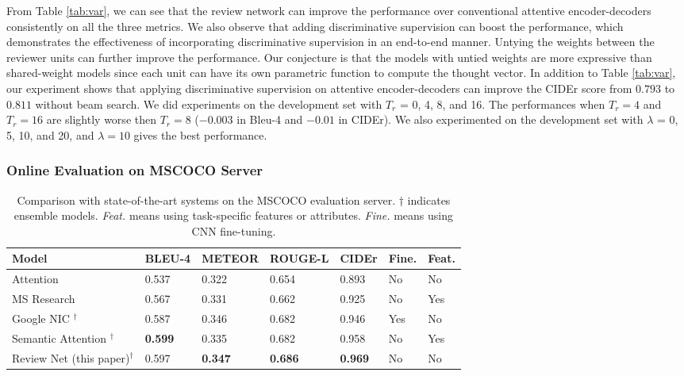 \documentclass{article}
\begin{document}
From Table \ref{tab:var}, we can see that the review network can improve the performance over conventional attentive encoder-decoders consistently on all the three metrics.
We also observe that adding discriminative supervision can boost the performance, which demonstrates the effectiveness of incorporating discriminative supervision in an end-to-end manner.
Untying the weights between the reviewer units can further improve the performance. Our conjecture is that the models with untied weights are more expressive than shared-weight models since each unit can have its own parametric function to compute the thought vector. In addition to Table \ref{tab:var}, our experiment shows that applying discriminative supervision on attentive encoder-decoders can improve the CIDEr score from $0.793$ to $0.811$ without beam search. We did experiments on the development set with $T_r$ = 0, 4, 8, and 16. The performances when $T_r = 4$ and $T_r = 16$ are slightly worse then $T_r = 8$ ($-0.003$ in Bleu-4 and $-0.01$ in CIDEr). We also experimented on the development set with $\lambda$ = 0, 5, 10, and 20, and $\lambda = 10$ gives the best performance.

\subsubsection{Online Evaluation on MSCOCO Server}\begin{table}[t]
  \caption{\small Comparison with state-of-the-art systems on the MSCOCO evaluation server. $\dagger$ indicates ensemble models. \textit{Feat.} means using task-specific features or attributes. \textit{Fine.} means using CNN fine-tuning.}
  \label{tab:sota}
  \centering
  \begin{tabular}{lllllll}
    \toprule
    Model & BLEU-4 & METEOR & ROUGE-L & CIDEr & Fine. & Feat. \\
    \midrule
    Attention \cite{xu2015show} & 0.537 & 0.322 & 0.654 & 0.893 & No & No \\
    MS Research \cite{fang2015captions} & 0.567  & 0.331 & 0.662 & 0.925 & No & Yes \\
    Google NIC \cite{vinyals2015show}$^{\dagger}$ & 0.587 & 0.346 & 0.682 & 0.946 & Yes & No  \\
    Semantic Attention \cite{you2016image}$^{\dagger}$ & \textbf{0.599} & 0.335  & 0.682 & 0.958 & No & Yes \\
    \midrule
    Review Net (this paper)$^{\dagger}$ & 0.597 & \textbf{0.347} & \textbf{0.686} & \textbf{0.969} & No & No \\
    \bottomrule
  \end{tabular}
\end{table}
\end{document}
